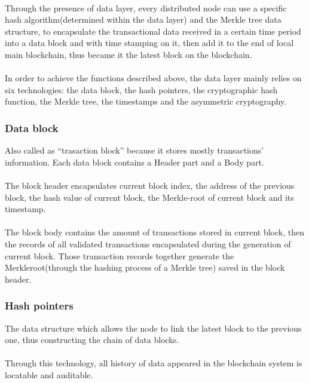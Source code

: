 \documentclass[doublespacing]{bmcart}
\begin{document}
\begin{CJK*}{UTF8}{gbsn}
\paragraph{} 
Through the presence of data layer, every distributed node can %
 use a specific hash algorithm(determined within the data layer) and the Merkle tree data structure, to encapsulate the transactional data received in a certain time period into a data block and with time stamping on it, then add it to the end of local main blockchain, thus became it the latest block on the blockchain.
\paragraph{} 
In order to achieve the functions described above, the data layer mainly relies on six technologies: the data block, the hash pointers, the cryptographic hash function, the Merkle tree, the timestamps and the asymmetric cryptography.
\subsubsection*{Data block}
Also called as ``trasaction block'' because it stores mostly transactions' information. Each data block contains a Header part and a Body part.
\paragraph{} 
The block header encapsulates current block index, the address of the previous block, the hash value of current block, the Merkle-root of current block and its timestamp.
\paragraph{} 
The block body contains the amount of transactions stored in current block, then the records of all validated transactions encapsulated during the generation of current block. Those transaction records together generate the Merkleroot(through the hashing process of a Merkle tree) saved in the block header. 
\subsubsection*{Hash pointers}
The data structure which allows the node to link the latest block to the previous one, thus constructing the chain of data blocks.
\paragraph{} 
Through this technology, all history of data appeared in the blockchain system is locatable and auditable.

\end{CJK*}
\end{document}
